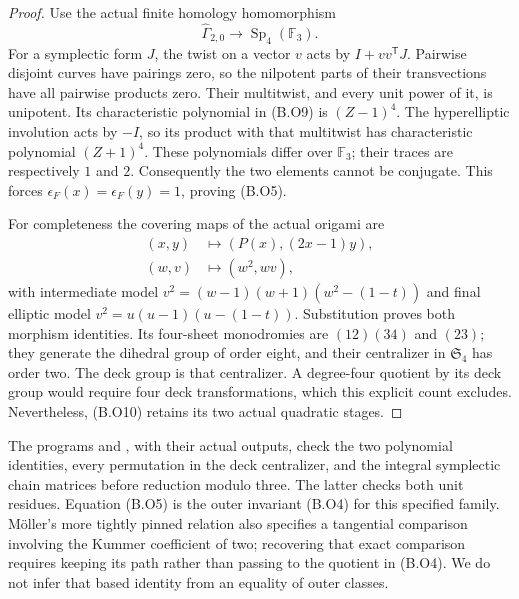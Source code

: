 \begin{proof}
Use the actual finite homology homomorphism
\[
 \widehat\Gamma_{2,0}\longrightarrow
                         \operatorname{Sp}_4(\mathbb F_3).
                                                        \tag{B.O9}
\]
For a symplectic form \(J\), the twist on a vector
\(v\) acts by \(I+vv^{\mathsf T}J\). Pairwise
disjoint curves have pairings zero, so the nilpotent
parts of their transvections have all pairwise
products zero. Their multitwist, and every unit
power of it, is unipotent. Its characteristic
polynomial in (B.O9) is \((Z-1)^4\). The
hyperelliptic involution acts by \(-I\), so its
product with that multitwist has characteristic
polynomial \((Z+1)^4\). These polynomials differ
over \(\mathbb F_3\); their traces are respectively
\(1\) and \(2\). Consequently the two elements
cannot be conjugate. This forces
\(\epsilon_F(x)=\epsilon_F(y)=1\), proving (B.O5).

For completeness the covering maps of the actual
origami are
\[
\begin{aligned}
 (x,y)&\longmapsto (P(x),(2x-1)y),\\
 (w,v)&\longmapsto (w^2,wv),
\end{aligned}                                                    \tag{B.O10}
\]
with intermediate model
\(v^2=(w-1)(w+1)(w^2-(1-t))\) and final elliptic
model \(v^2=u(u-1)(u-(1-t))\). Substitution proves
both morphism identities. Its four-sheet monodromies
are \((12)(34)\) and \((23)\); they generate the
dihedral group of order eight, and their centralizer
in \(\mathfrak S_4\) has order two. The deck group
is that centralizer. A degree-four quotient by its
deck group would require four deck transformations,
which this explicit count excludes. Nevertheless,
(B.O10) retains its two actual quadratic stages.
\end{proof}

The programs  and
, with
their actual outputs, check the two polynomial
identities, every permutation in the deck
centralizer, and the integral symplectic chain
matrices before reduction modulo three. The latter
checks both unit residues. Equation (B.O5) is the
outer invariant (B.O4) for this specified family.
M\"oller's more tightly pinned relation also specifies
a tangential comparison involving the Kummer
coefficient of two; recovering that exact comparison
requires keeping its path rather than passing to
the quotient in (B.O4). We do not infer that based
identity from an equality of outer classes.
